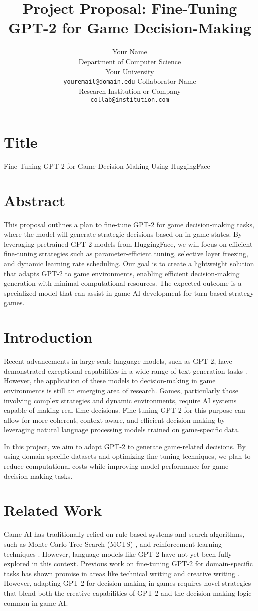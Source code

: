 \documentclass[11pt]{article}
\title{Project Proposal: Fine-Tuning GPT-2 for Game Decision-Making}
\author{
  Your Name \\
  Department of Computer Science \\
  Your University \\
  \texttt{youremail@domain.edu} \And
  Collaborator Name \\
  Research Institution or Company \\
  \texttt{collab@institution.com}
}
\date{}
\begin{document}
\maketitle

\section{Title}
Fine-Tuning GPT-2 for Game Decision-Making Using HuggingFace

\section{Abstract}
This proposal outlines a plan to fine-tune GPT-2 for game decision-making tasks, where the model will generate strategic decisions based on in-game states. By leveraging pretrained GPT-2 models from HuggingFace, we will focus on efficient fine-tuning strategies such as parameter-efficient tuning, selective layer freezing, and dynamic learning rate scheduling. Our goal is to create a lightweight solution that adapts GPT-2 to game environments, enabling efficient decision-making generation with minimal computational resources. The expected outcome is a specialized model that can assist in game AI development for turn-based strategy games.

\section{Introduction}
Recent advancements in large-scale language models, such as GPT-2, have demonstrated exceptional capabilities in a wide range of text generation tasks \citep{yoo2021gpt3mix}. However, the application of these models to decision-making in game environments is still an emerging area of research. Games, particularly those involving complex strategies and dynamic environments, require AI systems capable of making real-time decisions. Fine-tuning GPT-2 for this purpose can allow for more coherent, context-aware, and efficient decision-making by leveraging natural language processing models trained on game-specific data.

In this project, we aim to adapt GPT-2 to generate game-related decisions. By using domain-specific datasets and optimizing fine-tuning techniques, we plan to reduce computational costs while improving model performance for game decision-making tasks.

\section{Related Work}
Game AI has traditionally relied on rule-based systems and search algorithms, such as Monte Carlo Tree Search (MCTS) \citep{_wiechowski_2022}, and reinforcement learning techniques \citep{lu2022techniques}. However, language models like GPT-2 have not yet been fully explored in this context. Previous work on fine-tuning GPT-2 for domain-specific tasks has shown promise in areas like technical writing and creative writing \citep{boynagryan2024ai}. However, adapting GPT-2 for decision-making in games requires novel strategies that blend both the creative capabilities of GPT-2 and the decision-making logic common in game AI.
\end{document}
